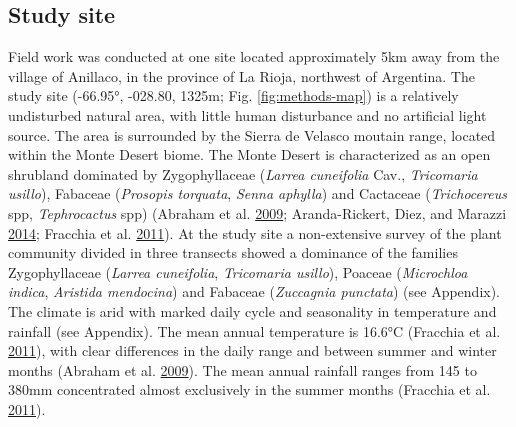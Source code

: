 \documentclass[msc,numbers,hidelinks]{coppe}
\begin{document}
  \hypertarget{study-site}{%
  \subsection{Study site}\label{study-site}}

  Field work was conducted at one site located approximately 5km away from the village of Anillaco, in the province of La Rioja, northwest of Argentina. The study site (-66.95°, -028.80, 1325m; Fig. \ref{fig:methods-map}) is a relatively undisturbed natural area, with little human disturbance and no artificial light source. The area is surrounded by the Sierra de Velasco moutain range, located within the Monte Desert biome. The Monte Desert is characterized as an open shrubland dominated by Zygophyllaceae (\emph{Larrea cuneifolia} Cav., \emph{Tricomaria usillo}), Fabaceae (\emph{Prosopis torquata}, \emph{Senna aphylla}) and Cactaceae (\emph{Trichocereus} spp, \emph{Tephrocactus} spp) (Abraham et al. \protect\hyperlink{ref-abrahamOverviewGeographyMonte2009}{2009}; Aranda-Rickert, Diez, and Marazzi \protect\hyperlink{ref-aranda-rickertExtrafloralNectarFuels2014}{2014}; Fracchia et al. \protect\hyperlink{ref-fracchiaDispersalArbuscularMycorrhizal2011}{2011}). At the study site a non-extensive survey of the plant community divided in three transects showed a dominance of the families Zygophyllaceae (\emph{Larrea cuneifolia}, \emph{Tricomaria usillo}), Poaceae (\emph{Microchloa indica}, \emph{Aristida mendocina}) and Fabaceae (\emph{Zuccagnia punctata}) (see Appendix). The climate is arid with marked daily cycle and seasonality in temperature and rainfall (see Appendix). The mean annual temperature is 16.6°C (Fracchia et al. \protect\hyperlink{ref-fracchiaDispersalArbuscularMycorrhizal2011}{2011}), with clear differences in the daily range and between summer and winter months (Abraham et al. \protect\hyperlink{ref-abrahamOverviewGeographyMonte2009}{2009}). The mean annual rainfall ranges from 145 to 380mm concentrated almost exclusively in the summer months (Fracchia et al. \protect\hyperlink{ref-fracchiaDispersalArbuscularMycorrhizal2011}{2011}).
\end{document}
